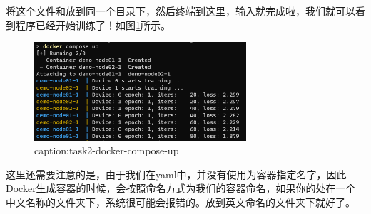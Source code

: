 将这个文件和放到同一个目录下，然后终端到这里，输入就完成啦，我们就可以看到程序已经开始训练了！如图\ref{fig:task2-docker-compose-up}所示。


\begin{figure}[htbp]
	\centering
	\includegraphics[width=0.7\textwidth]{figures/task2-docker-compose-up.png}
	\caption{caption:task2-docker-compose-up}
	\label{fig:task2-docker-compose-up}
\end{figure}

这里还需要注意的是，由于我们在yaml中，并没有使用为容器指定名字，因此Docker生成容器的时候，会按照命名方式为我们的容器命名，如果你的处在一个中文名称的文件夹下，系统很可能会报错的。放到英文命名的文件夹下就好了。
